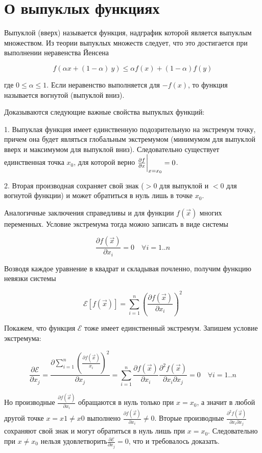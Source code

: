 \setcounter{chapter}{1}

\section{О выпуклых функциях}

Выпуклой (вверх) называется функция, надграфик которой является выпуклым множеством. Из теории выпуклых множеств следует, что это достигается при выполнении неравенства Йенсена


$$
 f(\alpha x + (1 - \alpha)\ y) \le \alpha f(x) + (1 - \alpha) f(y)
$$


где $0 \le \alpha \le 1$. Если неравенство выполняется для $-f(x)$, то функция называется вогнутой (выпуклой вниз).

Доказываются следующие важные свойства выпуклых функций:

1. Выпуклая функция имеет единственную подозрительную на экстремум точку, причем она будет являться глобальным экстремумом (минимумом для выпуклой вверх и максимумом для выпуклой вниз). Следовательно существует единственная точка $x_0$, для которой верно ${\partial f \over \partial x} \bigg | _{x=x_0} = 0$.

2. Вторая производная сохраняет свой знак ($>0$ для выпуклой и $<0$ для вогнутой функции) и может обратиться в нуль лишь в точке $x_0$.

Аналогичные заключения справедливы и для функции $f(\vec x)$ многих переменных. Условие экстремума тогда можно записать в виде системы


$$
\frac{\partial f(\vec x)}{\partial x_i} = 0 \quad \forall i = 1..n
$$


Возводя каждое уравнение в квадрат и складывая почленно, получим функцию невязки системы


$$
\mathcal E [f(\vec x)] = \sum\limits_{i=1}^n \left(\frac{\partial f(\vec x)}{\partial x_i}\right)^2
$$


Покажем, что функция $\mathcal E$ тоже имеет единственный экстремум. Запишем условие экстремума:


$$
\frac {\partial \mathcal E} {\partial x_j} = \frac {\partial \sum\limits_{i=1}^n \left(\frac{\partial f(\vec x)}{x_i}\right)^2} {\partial x_j} = \sum\limits_{i=1}^n \frac{\partial f(\vec x)}{\partial x_i} \frac{{\partial}^2 f(\vec x)}{\partial x_i \partial x_j} = 0 \quad \forall i = 1..n
$$


Но производные $\frac{\partial f(\vec x)}{\partial x_i}$ обращаются в нуль только при $x=x_0$, а значит в любой другой точке $x=x1\neq x0$ выполнено $\frac{\partial f(\vec x)}{\partial x_i} \neq 0$. Вторые производные $\frac{{\partial}^2 f(\vec x)}{\partial x_i \partial x_j}$ сохраняют свой знак и могут обратиться в нуль лишь при $x=x_0$. Следовательно при $x \neq x_0$ нельзя удовлетворить$\frac {\partial \mathcal E} {\partial x_j} = 0$, что и требовалось доказать.


